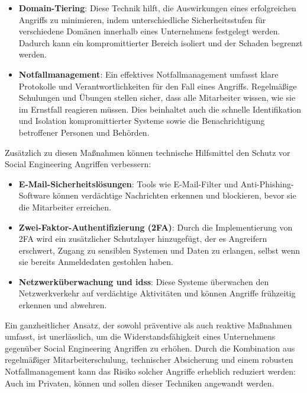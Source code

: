 \begin{itemize}
    \item \textbf{Domain-Tiering}: Diese Technik hilft, die Auswirkungen eines erfolgreichen Angriffs zu minimieren, indem unterschiedliche Sicherheitsstufen für verschiedene Domänen innerhalb eines Unternehmens festgelegt werden.
    Dadurch kann ein kompromittierter Bereich isoliert und der Schaden begrenzt werden.
    \item \textbf{Notfallmanagement}: Ein effektives Notfallmanagement umfasst klare Protokolle und Verantwortlichkeiten für den Fall eines Angriffs.
    Regelmäßige Schulungen und Übungen stellen sicher, dass alle Mitarbeiter wissen, wie sie im Ernstfall reagieren müssen.
    Dies beinhaltet auch die schnelle Identifikation und Isolation kompromittierter Systeme sowie die Benachrichtigung betroffener Personen und Behörden.
\end{itemize}

Zusätzlich zu diesen Maßnahmen können technische Hilfsmittel den Schutz vor Social Engineering Angriffen verbessern:

\begin{itemize}
    \item \textbf{E-Mail-Sicherheitslösungen}: Tools wie E-Mail-Filter und Anti-Phishing-Software können verdächtige Nachrichten erkennen und blockieren, bevor sie die Mitarbeiter erreichen.
    \item \textbf{Zwei-Faktor-Authentifizierung (2FA)}: Durch die Implementierung von 2FA wird ein zusätzlicher Schutzlayer hinzugefügt, der es Angreifern erschwert, Zugang zu sensiblen Systemen und Daten zu erlangen, selbst wenn sie bereits Anmeldedaten gestohlen haben.
    \item \textbf{Netzwerküberwachung und \glspl{ids}}: Diese Systeme überwachen den Netzwerkverkehr auf verdächtige Aktivitäten und können Angriffe frühzeitig erkennen und abwehren.
\end{itemize}

Ein ganzheitlicher Ansatz, der sowohl präventive als auch reaktive Maßnahmen umfasst, ist unerlässlich, um die Widerstandsfähigkeit eines Unternehmens gegenüber Social Engineering Angriffen zu erhöhen.
Durch die Kombination aus regelmäßiger Mitarbeiterschulung, technischer Absicherung und einem robusten Notfallmanagement kann das Risiko solcher Angriffe erheblich reduziert werden\cite{social-engineering-a-survey, bsi-social-engineering}: Auch im Privaten, können und sollen dieser Techniken angewandt werden.
